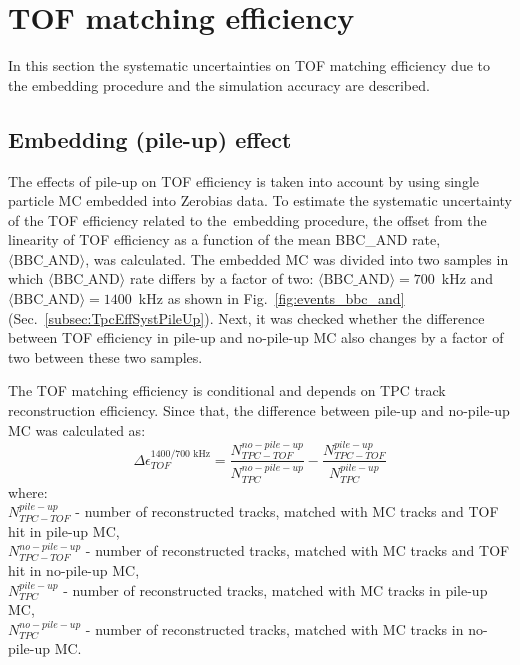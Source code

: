 \section{TOF matching efficiency}\label{sec:tofSystematics}
In this section the systematic uncertainties on TOF matching efficiency due to the embedding procedure and the simulation accuracy are described.
\subsection{Embedding (pile-up) effect}\label{sec:tofSystematicsPileUpEffect}
The effects of pile-up on TOF efficiency is taken into account by using single particle MC embedded into Zerobias data. To estimate the systematic uncertainty of the TOF efficiency related to the~embedding procedure, the offset from the linearity of TOF efficiency  as a function of the mean BBC\_AND rate, $\langle\text{BBC\_AND}\rangle$, was calculated. The embedded MC was divided into two samples in which $\langle\text{BBC\_AND}\rangle$ rate differs by a factor of two: \mbox{$\langle\text{BBC\_AND}\rangle=700$~kHz} and \mbox{$\langle\text{BBC\_AND}\rangle=1400$~kHz} as shown in Fig.~\ref{fig:events_bbc_and} (Sec.~\ref{subsec:TpcEffSystPileUp}).
Next, it was checked whether the difference between TOF efficiency in pile-up and no-pile-up MC also changes by a factor of two between these two samples.

\noindent
The TOF matching efficiency is conditional and depends on TPC track reconstruction efficiency. Since that, the difference between pile-up and  no-pile-up MC was calculated as:
\begin{equation}
\Delta\epsilon_{ TOF}^{1400/700\text{ kHz}}=\frac{N_{TPC-TOF}^{no-pile-up}}{N_{TPC}^{no-pile-up}}-\frac{N_{TPC-TOF}^{pile-up}}{N_{TPC}^{pile-up}}
\label{eq:tofSyst}
\end{equation}
where:\\
$N_{TPC-TOF}^{pile-up}$ - number of reconstructed tracks, matched with MC tracks and TOF hit in pile-up MC,\\
$N_{TPC-TOF}^{no-pile-up}$ - number of reconstructed tracks, matched with MC tracks and TOF hit in no-pile-up MC,\\
$N_{TPC}^{pile-up}$ - number of reconstructed tracks, matched with MC tracks in pile-up MC,\\
$N_{TPC}^{no-pile-up}$ - number of reconstructed tracks, matched with MC tracks in no-pile-up MC.
\newline

